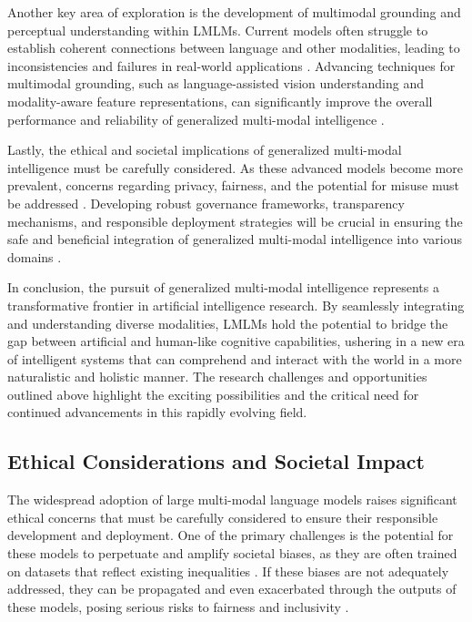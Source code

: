 \documentclass[11pt]{article}
\begin{document}
Another key area of exploration is the development of multimodal grounding and perceptual understanding within LMLMs. Current models often struggle to establish coherent connections between language and other modalities, leading to inconsistencies and failures in real-world applications \cite{ref361,ref26}. Advancing techniques for multimodal grounding, such as language-assisted vision understanding and modality-aware feature representations, can significantly improve the overall performance and reliability of generalized multi-modal intelligence \cite{ref362,ref16}.

Lastly, the ethical and societal implications of generalized multi-modal intelligence must be carefully considered. As these advanced models become more prevalent, concerns regarding privacy, fairness, and the potential for misuse must be addressed \cite{ref102}. Developing robust governance frameworks, transparency mechanisms, and responsible deployment strategies will be crucial in ensuring the safe and beneficial integration of generalized multi-modal intelligence into various domains \cite{ref363,ref364}.

In conclusion, the pursuit of generalized multi-modal intelligence represents a transformative frontier in artificial intelligence research. By seamlessly integrating and understanding diverse modalities, LMLMs hold the potential to bridge the gap between artificial and human-like cognitive capabilities, ushering in a new era of intelligent systems that can comprehend and interact with the world in a more naturalistic and holistic manner. The research challenges and opportunities outlined above highlight the exciting possibilities and the critical need for continued advancements in this rapidly evolving field.

\subsection{Ethical Considerations and Societal Impact}

The widespread adoption of large multi-modal language models raises significant ethical concerns that must be carefully considered to ensure their responsible development and deployment. One of the primary challenges is the potential for these models to perpetuate and amplify societal biases, as they are often trained on datasets that reflect existing inequalities \cite{ref229,ref88}. If these biases are not adequately addressed, they can be propagated and even exacerbated through the outputs of these models, posing serious risks to fairness and inclusivity \cite{ref87,ref365}.
\end{document}
